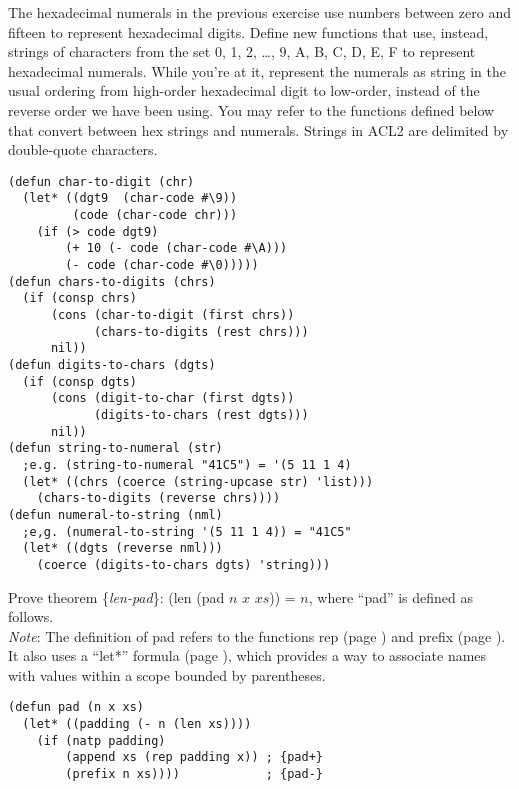 \begin{ExerciseList}
\Exercise The hexadecimal numerals in the previous exercise
       use numbers between zero and fifteen to represent
       hexadecimal digits. Define new functions that use,
       instead, strings of characters from the set
       {0, 1, 2, \dots, 9, A, B, C, D, E, F} to represent
       hexadecimal numerals.
       While you're at it, represent the numerals as string
       in the usual ordering from high-order hexadecimal digit to
       low-order, instead of the reverse order we have been using.
       You may refer to the functions defined below that convert
       between hex strings and numerals.
       Strings in ACL2 are delimited by double-quote characters.
\begin{Verbatim}
(defun char-to-digit (chr)
  (let* ((dgt9  (char-code #\9))
         (code (char-code chr)))
    (if (> code dgt9)
        (+ 10 (- code (char-code #\A)))
        (- code (char-code #\0)))))
(defun chars-to-digits (chrs)
  (if (consp chrs)
      (cons (char-to-digit (first chrs))
            (chars-to-digits (rest chrs)))
      nil))
(defun digits-to-chars (dgts)
  (if (consp dgts)
      (cons (digit-to-char (first dgts))
            (digits-to-chars (rest dgts)))
      nil))
(defun string-to-numeral (str)
  ;e.g. (string-to-numeral "41C5") = '(5 11 1 4)
  (let* ((chrs (coerce (string-upcase str) 'list)))
    (chars-to-digits (reverse chrs))))
(defun numeral-to-string (nml)
  ;e,g. (numeral-to-string '(5 11 1 4)) = "41C5"
  (let* ((dgts (reverse nml)))
    (coerce (digits-to-chars dgts) 'string)))
\end{Verbatim}

\Exercise Prove theorem \{\emph{len-pad}\}: (len (pad $n$ $x$ $xs$)) = $n$,
where ``pad'' is defined as follows. \\
\emph{Note}: The definition of pad refers to the functions
rep (page \pageref{rep-equations}) and prefix (page \pageref{prefix-equations}).
It also uses a ``let*'' formula (page \pageref{let*-def}),
which provides a way to associate
names with values within a scope bounded by parentheses.
\begin{samepage}
\begin{Verbatim}
(defun pad (n x xs)
  (let* ((padding (- n (len xs))))
    (if (natp padding)
        (append xs (rep padding x)) ; {pad+}
        (prefix n xs))))            ; {pad-}
\end{Verbatim}
\end{samepage}

\end{ExerciseList}

